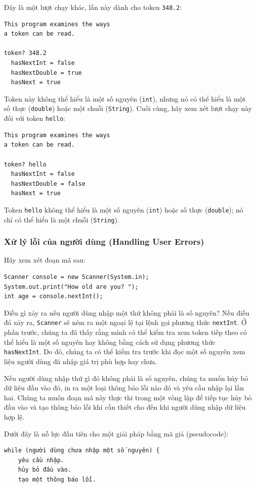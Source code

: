 Đây là một lượt chạy khác, lần này dành cho token \texttt{348.2}:

\begin{verbatim}
This program examines the ways 
a token can be read. 
 
token? 348.2 
  hasNextInt = false 
  hasNextDouble = true 
  hasNext = true 
\end{verbatim}

Token này không thể hiểu là một số nguyên (\texttt{int}), nhưng nó có thể hiểu là một số thực (\texttt{double}) hoặc một chuỗi (\texttt{String}). Cuối cùng, hãy xem xét lượt chạy này đối với token \texttt{hello}:

\begin{verbatim}
This program examines the ways 
a token can be read. 
 
token? hello 
  hasNextInt = false 
  hasNextDouble = false 
  hasNext = true 
\end{verbatim}

Token \texttt{hello} không thể hiểu là một số nguyên (\texttt{int}) hoặc số thực (\texttt{double}); nó chỉ có thể hiểu là một chuỗi (\texttt{String}).

\subsubsection*{Xử lý lỗi của người dùng (Handling User Errors)}

Hãy xem xét đoạn mã sau:

\begin{verbatim}
Scanner console = new Scanner(System.in);
System.out.print("How old are you? ");
int age = console.nextInt();
\end{verbatim}

Điều gì xảy ra nếu người dùng nhập một thứ không phải là số nguyên? Nếu điều đó xảy ra, \texttt{Scanner} sẽ ném ra một ngoại lệ tại lệnh gọi phương thức \texttt{nextInt}. Ở phần trước, chúng ta đã thấy rằng mình có thể kiểm tra xem token tiếp theo có thể hiểu là một số nguyên hay không bằng cách sử dụng phương thức \texttt{hasNextInt}. Do đó, chúng ta có thể kiểm tra trước khi đọc một số nguyên xem liệu người dùng đã nhập giá trị phù hợp hay chưa.

Nếu người dùng nhập thứ gì đó không phải là số nguyên, chúng ta muốn hủy bỏ dữ liệu đầu vào đó, in ra một loại thông báo lỗi nào đó và yêu cầu nhập lại lần hai. Chúng ta muốn đoạn mã này thực thi trong một vòng lặp để tiếp tục hủy bỏ đầu vào và tạo thông báo lỗi khi cần thiết cho đến khi người dùng nhập dữ liệu hợp lệ.

Dưới đây là nỗ lực đầu tiên cho một giải pháp bằng mã giả (pseudocode):

\begin{verbatim}
while (người dùng chưa nhập một số nguyên) {
    yêu cầu nhập.
    hủy bỏ đầu vào.
    tạo một thông báo lỗi.
\end{verbatim}

